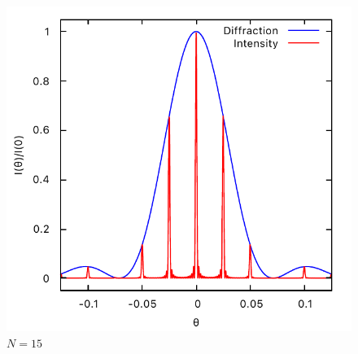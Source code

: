 \documentclass[11pt, twoside]{article}   	%
\theoremstyle{plain}
\theoremstyle{definition}
\begin{document}
\begin{description}
\begin{figure}[htbp]
		\begin{minipage}[t]{0.33\linewidth}
		\centering
		\includegraphics[width=0.9\linewidth]{N=15}
		\caption{$N=15$}
		\end{minipage}
		\medskip


\end{figure}
\end{description}
\end{document}
